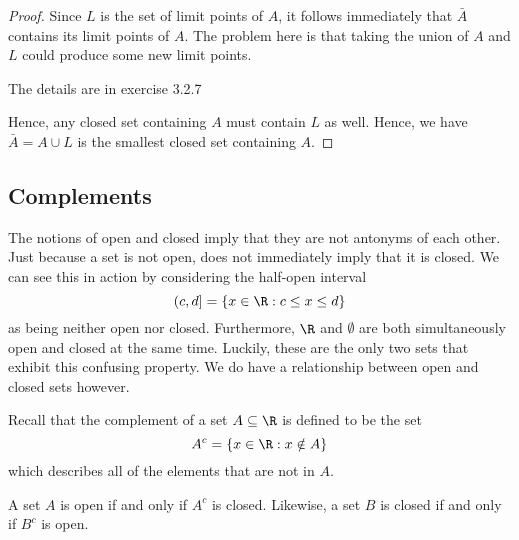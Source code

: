 \begin{proof}
    Since \( L \) is the set of limit points of \( A \), it follows immediately that \( \bar{A} \)
    contains its limit points of \( A \). The problem here is that taking the union of \( A \) and \( L \) could produce some new limit points. 
    \begin{center}
        The details are in exercise 3.2.7
    \end{center}
    Hence, any closed set containing \( A \) must contain \( L \) as well. Hence, we have 
    \( \bar{A} = A \cup L  \) is the smallest closed set containing \( A \). 
\end{proof}

\subsection{Complements}

The notions of open and closed imply that they are not antonyms of each other. Just because a set is not open, does not immediately imply that it is closed. We can see this in action by considering the half-open interval 
\[ (c,d] = \{ x \in \R : c \leq x \leq d \}  \]
as being neither open nor closed. Furthermore, \( \R \) and \( \emptyset \) are both simultaneously open and closed at the same time. Luckily, these are the only two sets that exhibit this confusing property. We do have a relationship between open and closed sets however.   

Recall that the complement of a set \( A \subseteq \R  \) is defined to be the set
\[ A^c = \{ x \in \R : x \notin A  \} \]
which describes all of the elements that are not in \( A \). 

\begin{tcolorbox}
\begin{thm}
A set \( A \) is open if and only if \( A^c \) is closed. Likewise, a set \( B \) is closed if and only if \( B^c \) is open. 
\end{thm}
\end{tcolorbox}

